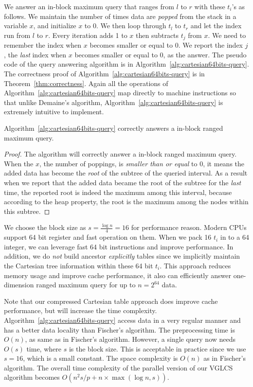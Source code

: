 We answer an in-block maximum query that ranges from $l$ to $r$ with
these $t_i$'s as follows.  We maintain the number of times data are
{\em popped} from the stack in a variable $x$, and initialize $x$ to
0.  We then loop through $t_l$ to $t_r$ and let the index run from $l$
to $r$.  Every iteration adds 1 to $x$ then subtracts $t_j$ from $x$.
We need to remember the index when $x$ becomes smaller or equal to 0.
We report the index $j$, the {\em last} index when $x$ becomes smaller
or equal to 0, as the answer.  The pseudo code of the query answering
algorithm is in Algorithm~\ref{alg:cartesian64bits-query}.  The
correctness proof of Algorithm~\ref{alg:cartesian64bits-query} is in
Theorem~\ref{thm:correctness}.  Again all the operations of
Algorithm~\ref{alg:cartesian64bits-query} map directly to machine
instructions so that unlike Demaine's algorithm,
Algorithm~\ref{alg:cartesian64bits-query} is extremely intuitive to
implement.

%



\begin{theorem} \label{thm:correctness}
  Algorithm~\ref{alg:cartesian64bits-query} correctly answers a
  in-block ranged maximum query.
\end{theorem}
\begin{proof}
The algorithm will correctly answer a in-block ranged maximum query.
When the $x$, the number of poppings, is {\em smaller than or equal}
to 0, it means the added data has become the {\em root} of the subtree
of the queried interval.  As a result when we report that the added
data became the root of the subtree for the {\em last} time, the
reported root is indeed the maximum among this interval, because
according to the heap property, the root is the maximum among the
nodes within this subtree.
\end{proof}

We choose the block size as $s = {{\frac{\log n}{4}}} = 16$ for
performance reason.  Modern CPUs support 64 bit register and fast
operation on them.  When we pack 16 $t_i$ in to a 64 integer, we can
leverage fast 64 bit instructions and improve performance.  In
addition, we do {\em not} build ancestor {\em explicitly} tables
since we implicitly maintain the Cartesian tree information within
these 64 bit $t_i$.  This approach reduces memory usage and improve
cache performance, it also can efficiently answer one-dimension ranged
maximum query for up to $n = 2^{64}$ data.

Note that our compressed Cartesian table approach does improve cache
performance, but will increase the time complexity.
Algorithm~\ref{alg:cartesian64bits-query} access data in a very
regular manner and has a better data locality than Fischer's
algorithm.  The preprocessing time is $O(n)$, as same as in Fischer's
algorithm.  However, a single query now needs $O(s)$ time, where $s$
is the block size.  This is acceptable in practice since we use $s =
16$, which is a small constant.  The space complexity is $O(n)$ as in
Fischer's algorithm.  The overall time complexity of the parallel
version of our VGLCS algorithm becomes $O(n^2 s / p + n \times
\max(\log n, s))$.

